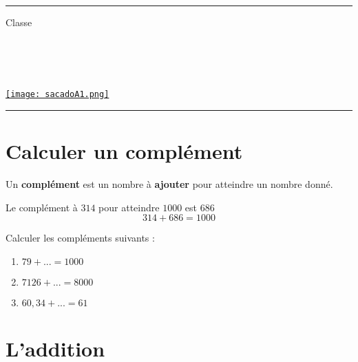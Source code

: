 \documentclass[a4paper,dvipsnames]{article}
\begin{document}

\fancyhead[C]{}
\hrule\medskip %
\begin{minipage}{0.295\textwidth} 
\raggedright
Classe \myClasse \hfill\\
\myDiscipline \hfill\\
\myParcours \hfill\\
\end{minipage}
\begin{minipage}{0.4\textwidth} 
\centering 
\scshape\huge
\textcolor{sacado_purple}{\myTitle} \\ 
\normalsize 
\end{minipage}
\begin{minipage}{0.295\textwidth} 
\raggedleft
\href{https://sacado.xyz/}{\texttt{[image: sacadoA1.png]}}
\end{minipage}
\medskip \hrule
\bigskip


\section{Calculer un complément}

\begin{Def}
Un \textbf{complément} est un nombre à \textbf{ajouter} pour atteindre un nombre donné.
\end{Def}

\begin{Ex}
Le complément à $314$ pour atteindre $1000$ est $686$
\[314+686=1000\]
\end{Ex}

\begin{ExOApp}[]
Calculer les compléments suivants :
\begin{enumerate}
\item $79+...=1000$
\item $7126+...=8000$
\item $60,34+...=61$
\end{enumerate}
\end{ExOApp}

\section{L'addition}
\end{document}

